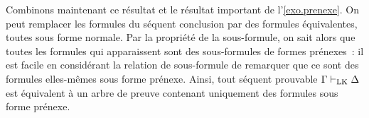 Combinons maintenant ce résultat et le résultat important de
l'\cref{exo.prenexe}. On peut remplacer les formules du séquent conclusion par
des formules équivalentes, toutes sous forme normale. Par la propriété de la
sous-formule, on sait alors que toutes les formules qui apparaissent sont
des sous-formules de formes prénexes~: il est facile en considérant la relation
de sous-formule de remarquer que ce sont des formules elles-mêmes sous forme
prénexe. Ainsi, tout séquent prouvable $\Gamma \vdash_{\operatorname{LK}} \Delta$ est équivalent à
un arbre de preuve contenant uniquement des formules sous forme prénexe.

\begin{figure}[t]
\end{figure}

